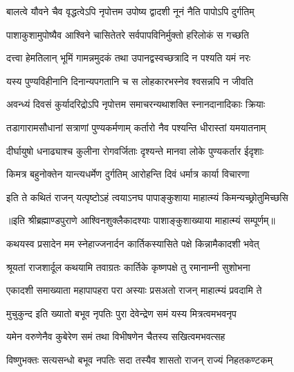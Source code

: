 \twolineshloka
{बालत्वे यौवने चैव वृद्धत्वेऽपि नृपोत्तम}
{उपोष्य द्वादशी नूनं नैति पापोऽपि दुर्गतिम्} %

\twolineshloka
{पाशाकुशामुपोष्यैव आश्विने चासितेतरे}
{सर्वपापविनिर्मुक्तो हरिलोकं स गच्छति} %

\twolineshloka
{दत्त्वा हेमतिलान् भूमिं गामन्नमुदकं तथा}
{उपानद्वस्वच्छत्रादि न पश्यति यमं नरः} %

\twolineshloka
{यस्य पुण्यविहीनानि दिनान्यपगतानि च}
{स लोहकारभस्नेव श्वसन्नपि न जीवति} %

\twolineshloka
{अवन्ध्यं दिवसं कुर्यादरिद्रोऽपि नृपोत्तम}
{समाचरन्यथाशक्ति स्नानदानादिकाः क्रियाः} %

\twolineshloka
{तडागारामसौधानां सत्राणां पुण्यकर्मणाम्}
{कर्तारो नैव पश्यन्ति धीरास्तां यमयातनाम्} %

\twolineshloka
{दीर्घायुषो धनाढ्याश्च कुलीना रोगवर्जिताः}
{दृश्यन्ते मानवा लोके पुण्यकर्तार ईदृशाः} %

\twolineshloka
{किमत्र बहुनोक्तेन यान्त्यधर्मेण दुर्गतिम्}
{आरोहन्ति दिवं धर्मात्र कार्या विचारणा} %

\twolineshloka
{इति ते कथितं राजन् यत्पृष्टोऽहं त्वयाऽनघ}
{पापाङ्कुशाया माहात्म्यं किमन्यच्छ्रोतुमिच्छसि} %

॥इति श्रीब्रह्माण्डपुराणे आश्विनशुक्लैकादश्याः पाशाङ्कुशाख्याया माहात्म्यं सम्पूर्णम्॥


\hyperref[sec:ekadashi_mahatmyam_vrata_raja]{\closesub}
\clearpage

\label{sec:vrata-raja-karttika-krishna-rama}


\twolineshloka
{कथयस्व प्रसादेन मम स्नेहाज्जनार्दन}
{कार्तिकस्यासिते पक्षे किन्नामैकादशी भवेत्} %


\twolineshloka
{श्रूयतां राजशार्दूल कथयामि तवाग्रतः}
{कार्तिके कृष्णपक्षे तु रमानाम्नी सुशोभना} %

\twolineshloka
{एकादशी समाख्याता महापापहरा परा}
{अस्याः प्रसअतो राजन् माहात्म्यं प्रवदामि ते} %

\twolineshloka
{मुचुकुन्द इति ख्यातो बभूव नृपतिः पुरा}
{देवेन्द्रेण समं यस्य मित्रत्वमभवनृप} %

\twolineshloka
{यमेन वरुणेनैव कुबेरेण समं तथा}
{विभीषणेन चैतस्य सखित्वमभवत्सह} %

\twolineshloka
{विष्णुभक्तः सत्यसन्धो बभूव नपतिः सदा}
{तस्यैव शासतो राजन् राज्यं निहतकण्टकम्} %

